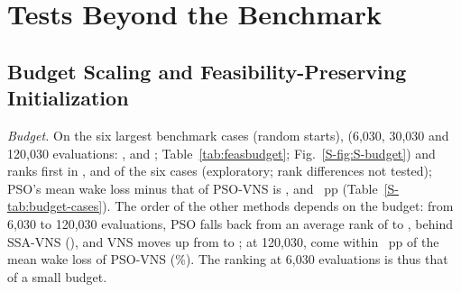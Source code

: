 \section{Tests Beyond the Benchmark}
\label{sec:beyond}
\subsection{Budget Scaling and Feasibility-Preserving Initialization}
\label{sec:feasinit}
\label{sec:budget}


\emph{Budget.} On the six largest benchmark cases (random starts), \NBudgetPhrase{} (6,030, 30,030 and 120,030 evaluations: \NBudRankPSOVNSSixK, \NBudRankPSOVNSThirtyK{} and \NBudRankPSOVNSOneTwentyK; Table~\ref{tab:feasbudget}; Fig.~\ref{S-fig:S-budget}) and ranks first in \NBudFirstPSOVNSSixK, \NBudFirstPSOVNSThirtyK{} and \NBudFirstPSOVNSOneTwentyK{} of the six cases (exploratory; rank differences not tested); PSO's mean wake loss minus that of PSO-VNS is \NBudGainPSOSixK, \NBudGainPSOThirtyK{} and \NBudGainPSOOneTwentyK~pp (Table~\ref{S-tab:budget-cases}). The order of the other methods depends on the budget: from 6,030 to 120,030 evaluations, PSO falls back from an average rank of \NBudRankPSOSixK{} to \NBudRankPSOOneTwentyK, behind SSA-VNS (\NBudRankSSAVNSOneTwentyK), and VNS moves up from \NBudRankVNSSixK{} to \NBudRankVNSOneTwentyK; at 120,030, \NBudCloseListOneTwentyK{} come within \NBudCloseGapOneTwentyK~pp of the mean wake loss of PSO-VNS (\NBudLossPSOVNSOneTwentyK\%). The ranking at 6,030 evaluations is thus that of a small budget.

